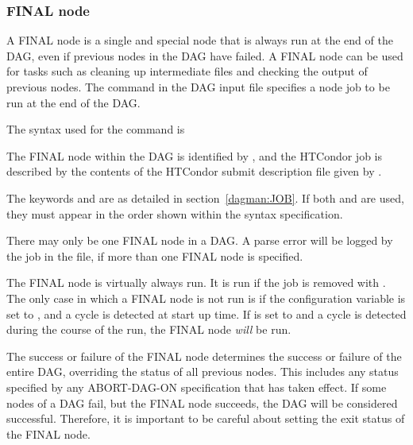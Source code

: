 \subsubsection{\label{sec:DAGFinalNode}FINAL node}

A FINAL node is a single and special node that is always run at 
the end of the DAG,
even if previous nodes in the DAG have failed.  
A FINAL node can be used
for tasks such as cleaning up intermediate files and checking the output
of previous nodes.
The  command in the DAG input file specifies 
a node job to be run at the end of the DAG.  

The syntax used for the  command is

  
 

The FINAL node within the DAG is identified by , 
and the HTCondor job
is described by the contents of the HTCondor submit description file
given by .

The keywords  and  
are as detailed in section~\ref{dagman:JOB}.
If both  and  are used, 
they must appear in the order shown within the syntax specification.

There may only be one FINAL node in a DAG.
A parse error will be logged by the  job in the
 file,
if more than one FINAL node is specified.

The FINAL node is virtually always run.
It is run if the  job is removed with .
The only case in which a FINAL node is not run
is if the configuration variable  
is set to ,
and a cycle is detected at start up time.
If  is set to  and
a cycle is detected during the course of the run, 
the FINAL node \emph{will} be run.

The success or failure of the FINAL node 
determines the success or failure of the entire DAG,
overriding the status of all previous nodes.
This includes any status specified by any ABORT-DAG-ON specification
that has taken effect.
If some nodes of a DAG fail,
but the FINAL node succeeds, the DAG will be considered successful.
Therefore, it is important
to be careful about setting the exit status of the FINAL node.

